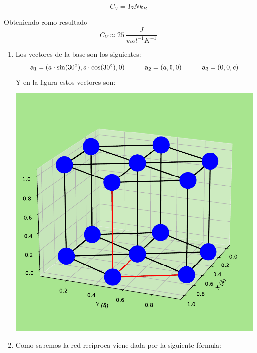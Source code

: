 \begin{solucion}
\begin{enumerate}[label=\alph*)]
		\begin{equation*}
			C_V=3zNk_B
		\end{equation*}
		 
		Obteniendo como resultado
		\begin{equation*}
			C_V  \approx 25\ \unit{\frac{J}{mol^{-1} K^{-1}}}
		\end{equation*} 
		
	\end{enumerate}
	
\end{solucion}	

\begin{solucion}
	\begin{enumerate}[label=\alph*)]
		\item Los vectores de la base son los siguientes:
		\begin{equation*}
			\mathbf{a}_1 = (a\cdot \sin(30^\circ),a\cdot \cos(30^\circ),0) \quad \quad \quad 
			\mathbf{a}_2 = (a,0,0) \quad \quad \quad
			\mathbf{a}_3 = (0,0,c)
		\end{equation*}
		Y en la figura estos vectores son:
		
		\begin{center}
			\includegraphics[scale=0.5]{Imagenes/2023-Enero-03.pdf}
		\end{center}
		
		\item Como sabemos la red recíproca viene dada por la siguiente fórmula: 
		

\end{enumerate}
\end{solucion}
